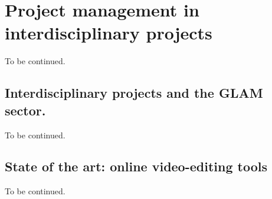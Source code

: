 \chapter{Project management in interdisciplinary projects}
\label{ch:ch2_ProjectManagement}


To be continued. 

\section{Interdisciplinary projects and the GLAM sector.}

To be continued. 

\section{State of the art: online video-editing tools}

To be continued. 